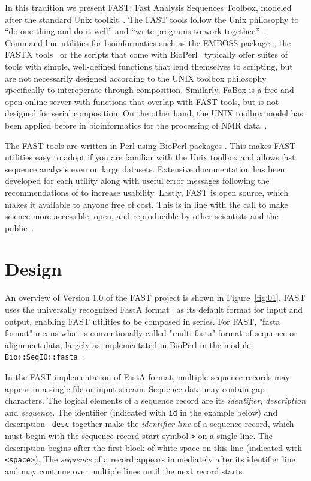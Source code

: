 \documentclass{frontiersSCNS} %
\begin{document}
In this tradition we present FAST: Fast Analysis Sequences Toolbox,
modeled after the standard Unix toolkit~\citep{Peek2001}. The FAST
tools follow the Unix philosophy to ``do one thing and do it well''
and ``write programs to work
together.''~\citep{Stutz2000}. Command-line utilities for
bioinformatics such as the EMBOSS package~\citep{Rice2000}, the FASTX
tools~\citep{fastx} or the scripts that come with
BioPerl~\citep{Stajich2002} typically offer suites of tools with
simple, well-defined functions that lend themselves to scripting, but
are not necessarily designed according to the UNIX toolbox philosophy
specifically to interoperate through composition. Similarly, FaBox is
a free and open online server with functions that overlap with FAST
tools, but is not designed for serial composition. On the other hand,
the UNIX toolbox model has been applied before in bioinformatics for
the processing of NMR data~\citep{delaglio1995nmrpipe}.

The FAST tools are written in Perl using BioPerl packages
\citep{Stajich2002}. This makes FAST utilities easy to adopt if you
are familiar with the Unix toolbox and allows fast sequence analysis
even on large datasets. Extensive documentation has been developed for
each utility along with useful error messages following the
recommendations of \citep{Seemann2013} to increase usability. Lastly,
FAST is open source, which makes it available to anyone free of
cost. This is in line with the call to make science more accessible,
open, and reproducible by other scientists and the
public~\citep{Groves2012}.

\section{Design}

An overview of Version 1.0 of the FAST project is shown in
Figure~\ref{fig:01}. FAST uses the universally recognized FastA
format~\citep{lipman1985rapid} as its default format for input and
output, enabling FAST utilities to be composed in series. For FAST,
"fasta format" means what is conventionally called "multi-fasta"
format of sequence or alignment data, largely as implementated in
BioPerl in the module {\tt Bio::SeqIO::fasta}~\citep{Stajich2002}.

In the FAST implementation of FastA format, multiple sequence records
may appear in a single file or input stream. Sequence data may contain
gap characters. The logical elements of a sequence record are its {\it
  identifier}, {\it description} and {\it sequence}. The identifier
(indicated with {\tt id} in the example below) and description {\tt
  desc} together make the {\it identifier line} of a sequence record,
which must begin with the sequence record start symbol {\tt >} on a
single line. The description begins after the first block of
white-space on this line (indicated with {\tt <space>}). The {\it
  sequence} of a record appears immediately after its identifier line
and may continue over multiple lines until the next record starts.
\end{document}
